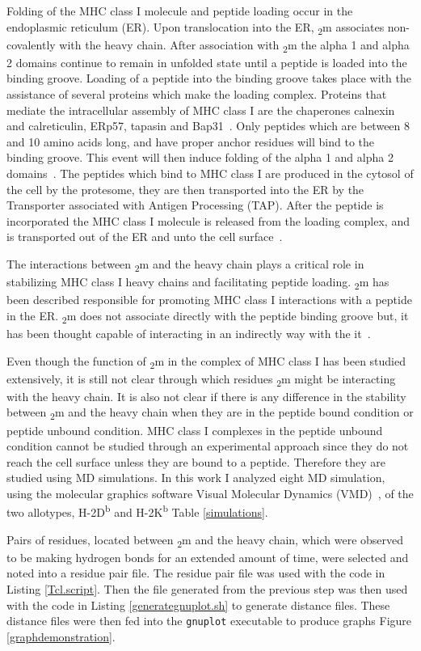 \documentclass[11pt,twocolumn]{article}
\newcommand{\db}{H-2D\textsuperscript{b}\xspace}
\newcommand{\kb}{H-2K\textsuperscript{b}\xspace}
\newcommand{\btm}{\textbeta\textsubscript{2}m\xspace}
\begin{document}
Folding of the MHC class I molecule and peptide loading occur in the endoplasmic reticulum (ER). Upon translocation 
into the ER, \btm associates non-covalently with the heavy chain. After association with \btm the 
alpha 1 and alpha 2 domains continue to remain in unfolded state until a peptide is loaded into the binding groove. 
Loading of a peptide into the binding groove takes place with the assistance of several proteins which make the 
loading complex. Proteins that mediate the intracellular assembly of MHC class I are the chaperones calnexin and 
calreticulin, ERp57, tapasin and Bap31~\cite{zhang2006assembly}. Only peptides which are between 8 and 10 amino acids 
long, and have proper anchor residues will bind to the binding groove. This event will then induce folding of the 
alpha 1 and alpha 2 domains~\cite{simone2012analysis}. The peptides which bind to MHC class I are produced in the 
cytosol of the cell by the protesome, they are then transported into the ER by the Transporter associated with 
Antigen Processing (TAP). After the peptide is incorporated the MHC class I molecule is released from the loading 
complex, and is transported out of the ER and unto the cell surface~\cite{lundegaard2012predictions}.


The interactions between \btm and the heavy chain plays a critical role in stabilizing MHC class I heavy chains and facilitating 
peptide loading. \btm has been described responsible for promoting MHC class I interactions with a peptide in the ER.
\btm does not associate directly with the peptide binding groove but, it has been thought capable of interacting in an indirectly way with the it~\cite{smith1993alteration}.

Even though the function of \btm in the complex of MHC class I has been studied extensively, it is still not clear through which 
residues  \btm might be interacting with the heavy chain. It is also not clear if there is any difference in the stability between \btm and the heavy chain when they are in the peptide bound condition or peptide unbound condition. MHC class I complexes in the peptide unbound condition cannot be studied through an experimental approach since they do not reach the cell surface unless they are bound to a peptide. Therefore they are studied 
using MD simulations. In this work I analyzed eight MD simulation, using the molecular graphics software Visual Molecular Dynamics (VMD)~\cite{vmd96}, of the two allotypes, \db and \kb Table \ref{simulations}. 

Pairs of residues, located between \btm and the heavy chain, which were observed to be making hydrogen bonds for an extended amount of time, were selected and noted into a residue pair file. The residue pair file was used with the code in Listing \ref{Tcl.script}.  Then the  file generated from the previous step was then used with the code in Listing \ref{generategnuplot.sh} to generate distance files. These distance files were then fed into the \texttt{gnuplot} executable to produce graphs Figure \ref{graphdemonstration}. 
\end{document}
